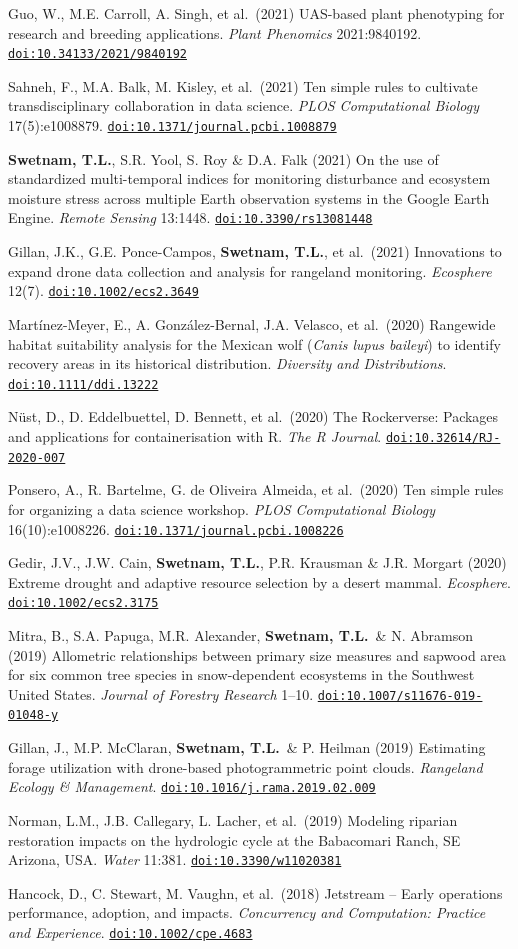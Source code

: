 \documentclass[11pt,letterpaper]{article}
\newcommand{\me}{\textbf{Swetnam, T.L.}}
\newcommand{\doi}[1]{\href{https://doi.org/#1}{\nolinkurl{doi:#1}}}
\newcounter{revno}
\newenvironment{revlist}[1]
  {\setcounter{revno}{#1}\stepcounter{revno}%
   \begin{list}{}{\setlength{\leftmargin}{2.1em}\setlength{\labelwidth}{1.7em}%
     \setlength{\labelsep}{0.4em}\setlength{\itemsep}{3.5pt}\setlength{\parsep}{0pt}\setlength{\topsep}{2pt}}}
  {\end{list}}
\newcommand{\pub}{\addtocounter{revno}{-1}\item[{\small\color{muted}\arabic{revno}.}]}
\begin{document}
\begin{revlist}{40}
\pub Guo, W., M.E. Carroll, A. Singh, et al.\ (2021) UAS-based plant phenotyping for research and breeding applications. \textit{Plant Phenomics} 2021:9840192. \doi{10.34133/2021/9840192}
\pub Sahneh, F., M.A. Balk, M. Kisley, et al.\ (2021) Ten simple rules to cultivate transdisciplinary collaboration in data science. \textit{PLOS Computational Biology} 17(5):e1008879. \doi{10.1371/journal.pcbi.1008879}
\pub \me, S.R. Yool, S. Roy \& D.A. Falk (2021) On the use of standardized multi-temporal indices for monitoring disturbance and ecosystem moisture stress across multiple Earth observation systems in the Google Earth Engine. \textit{Remote Sensing} 13:1448. \doi{10.3390/rs13081448}
\pub Gillan, J.K., G.E. Ponce-Campos, \me, et al.\ (2021) Innovations to expand drone data collection and analysis for rangeland monitoring. \textit{Ecosphere} 12(7). \doi{10.1002/ecs2.3649}
\pub Mart\'inez-Meyer, E., A. Gonz\'alez-Bernal, J.A. Velasco, et al.\ (2020) Rangewide habitat suitability analysis for the Mexican wolf (\textit{Canis lupus baileyi}) to identify recovery areas in its historical distribution. \textit{Diversity and Distributions}. \doi{10.1111/ddi.13222}
\pub N\"ust, D., D. Eddelbuettel, D. Bennett, et al.\ (2020) The Rockerverse: Packages and applications for containerisation with R. \textit{The R Journal}. \doi{10.32614/RJ-2020-007}
\pub Ponsero, A., R. Bartelme, G. de Oliveira Almeida, et al.\ (2020) Ten simple rules for organizing a data science workshop. \textit{PLOS Computational Biology} 16(10):e1008226. \doi{10.1371/journal.pcbi.1008226}
\pub Gedir, J.V., J.W. Cain, \me, P.R. Krausman \& J.R. Morgart (2020) Extreme drought and adaptive resource selection by a desert mammal. \textit{Ecosphere}. \doi{10.1002/ecs2.3175}
\pub Mitra, B., S.A. Papuga, M.R. Alexander, \me\ \& N. Abramson (2019) Allometric relationships between primary size measures and sapwood area for six common tree species in snow-dependent ecosystems in the Southwest United States. \textit{Journal of Forestry Research} 1--10. \doi{10.1007/s11676-019-01048-y}
\pub Gillan, J., M.P. McClaran, \me\ \& P. Heilman (2019) Estimating forage utilization with drone-based photogrammetric point clouds. \textit{Rangeland Ecology \& Management}. \doi{10.1016/j.rama.2019.02.009}
\pub Norman, L.M., J.B. Callegary, L. Lacher, et al.\ (2019) Modeling riparian restoration impacts on the hydrologic cycle at the Babacomari Ranch, SE Arizona, USA. \textit{Water} 11:381. \doi{10.3390/w11020381}
\pub Hancock, D., C. Stewart, M. Vaughn, et al.\ (2018) Jetstream -- Early operations performance, adoption, and impacts. \textit{Concurrency and Computation: Practice and Experience}. \doi{10.1002/cpe.4683}

\end{revlist}
\end{document}

